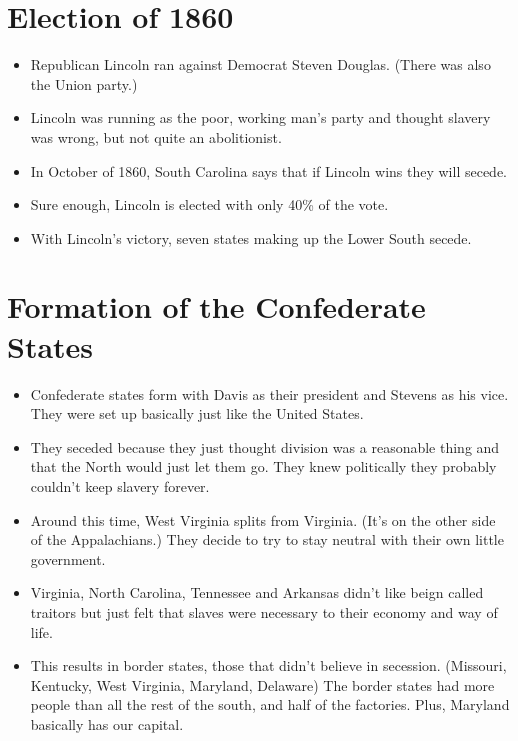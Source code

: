 \documentclass{article}
\begin{document}
\section{Election of 1860}
  \begin{itemize}
    \item Republican Lincoln ran against Democrat Steven Douglas. (There was also the Union party.)
    \item Lincoln was running as the poor, working man's party and thought slavery was wrong, but not quite an abolitionist.
    \item In October of 1860, South Carolina says that if Lincoln wins they will secede.
    \item Sure enough, Lincoln is elected with only 40\% of the vote. 
    \item With Lincoln's victory, seven states making up the Lower South secede.
  \end{itemize}

\section{Formation of the Confederate States}
  \begin{itemize}
    \item Confederate states form with Davis as their president and Stevens as his vice. They were set up basically just like the United States.
    \item They seceded because they just thought division was a reasonable thing and that the North would just let them go. They knew politically they probably couldn't keep slavery forever.
    \item Around this time, West Virginia splits from Virginia. (It's on the other side of the Appalachians.) They decide to try to stay neutral with their own little government.
    \item Virginia, North Carolina, Tennessee and Arkansas didn't like beign called traitors but just felt that slaves were necessary to their economy and way of life.
    \item This results in border states, those that didn't believe in secession. (Missouri, Kentucky, West Virginia, Maryland, Delaware) The border states had more people than all the rest of the south, and half of the factories. Plus, Maryland basically has our capital.
  \end{itemize}
\end{document}
